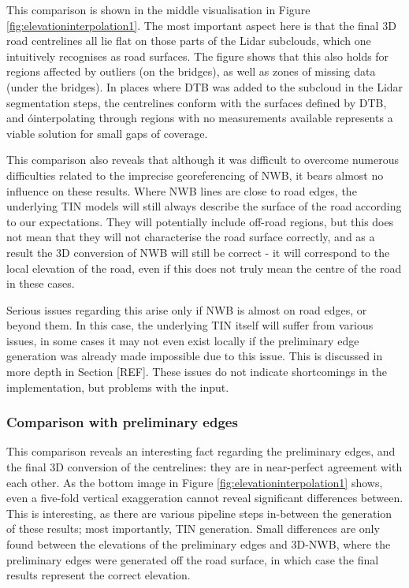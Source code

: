 This comparison is shown in the middle visualisation in Figure \ref{fig:elevationinterpolation1}. The most important aspect here is that the final 3D road centrelines all lie flat on those parts of the Lidar subclouds, which one intuitively recognises as road surfaces. The figure shows that this also holds for regions affected by outliers (on the bridges), as well as zones of missing data (under the bridges). In places where DTB was added to the subcloud in the Lidar segmentation steps, the centrelines conform with the surfaces defined by DTB, and óinterpolating through regions with no measurements available represents a viable solution for small gaps of coverage.

This comparison also reveals that although it was difficult to overcome numerous difficulties related to the imprecise georeferencing of NWB, it bears almost no influence on these results. Where NWB lines are close to road edges, the underlying TIN models will still always describe the surface of the road according to our expectations. They will potentially include off-road regions, but this does not mean that they will not characterise the road surface correctly, and as a result the 3D conversion of NWB will still be correct - it will correspond to the local elevation of the road, even if this does not truly mean the centre of the road in these cases.

Serious issues regarding this arise only if NWB is almost on road edges, or beyond them. In this case, the underlying TIN itself will suffer from various issues, in some cases it may not even exist locally if the preliminary edge generation was already made impossible due to this issue. This is discussed in more depth in Section [REF]. These issues do not indicate shortcomings in the implementation, but problems with the input.

\subsubsection{Comparison with preliminary edges}

This comparison reveals an interesting fact regarding the preliminary edges, and the final 3D conversion of the centrelines: they are in near-perfect agreement with each other. As the bottom image in Figure \ref{fig:elevationinterpolation1} shows, even a five-fold vertical exaggeration cannot reveal significant differences between. This is interesting, as there are various pipeline steps in-between the generation of these results; most importantly, TIN generation. Small differences are only found between the elevations of the preliminary edges and 3D-NWB, where the preliminary edges were generated off the road surface, in which case the final results represent the correct elevation.

